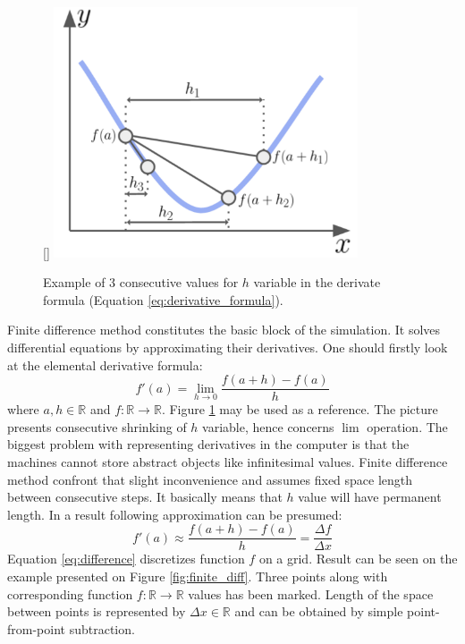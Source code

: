 \documentclass{report}
\begin{document}
\begin{figure}
  \raisebox{0pt}[\dimexpr{}\baselineskip\relax]
  {
    \includegraphics[width=0.8\textwidth]{images/derivative.pdf}
  }
  \caption{Example of 3 consecutive values for $h$ variable in the derivate formula (Equation \ref{eq:derivative_formula}).}
  \label{fig:derivative}
\end{figure}

Finite difference method constitutes the basic block of the simulation. It solves differential equations by approximating their derivatives. One should firstly look at the elemental derivative formula:
\begin{equation} \label{eq:derivative_formula}
f'(a) = \lim_{h \rightarrow 0} \frac{f(a+h) - f(a)}{h}
\end{equation}
where $a, h \in \mathbb{R}$ and $f: \mathbb{R} \rightarrow \mathbb{R}$. Figure \ref{fig:derivative} may be used as a reference. The picture presents consecutive shrinking of $h$ variable, hence concerns $\lim$ operation. The biggest problem with representing derivatives in the computer is that the machines cannot store abstract objects like infinitesimal values. Finite difference method confront that slight inconvenience and assumes fixed space length between consecutive steps. It basically means that $h$ value will have permanent length. In a result following approximation can be presumed:
\begin{equation} \label{eq:difference}
f'(a) \approx \frac{f(a+h) - f(a)}{h} = \frac{\Delta f}{\Delta x}
\end{equation}
Equation \ref{eq:difference} discretizes function $f$ on a grid. Result can be seen on the example presented on Figure \ref{fig:finite_diff}. Three points along with corresponding function $f: \mathbb{R} \rightarrow \mathbb{R}$ values has been marked. Length of the space between points is represented by $\Delta x \in \mathbb{R}$ and can be obtained by simple point-from-point subtraction.
\end{document}
